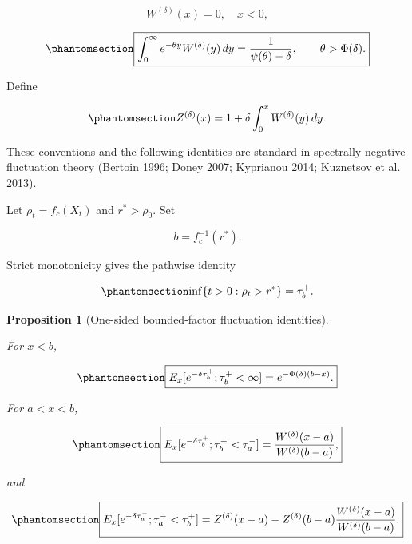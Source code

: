 \documentclass[
  english,
  11pt,
  letterpaper,
  DIV=11,
  numbers=noendperiod]{scrartcl}
\theoremstyle{plain}
\theoremstyle{plain}
\theoremstyle{plain}
\theoremstyle{plain}
\newtheorem{proposition}{Proposition}[section]
\theoremstyle{remark}
\begin{document}
\[
W^{(\delta)}(x)=0,\quad x<0,
\]

\begin{equation}\protect\phantomsection\label{eq-scale-normalization}{
\boxed{
\int_0^\infty e^{-\theta y}W^{(\delta)}(y)\,dy
=\frac1{\psi(\theta)-\delta},
\qquad
\theta>\Phi(\delta).
}
}\end{equation}

Define

\begin{equation}\protect\phantomsection\label{eq-Z-scale}{
Z^{(\delta)}(x)
=1+\delta\int_0^xW^{(\delta)}(y)\,dy.
}\end{equation}

These conventions and the following identities are standard in
spectrally negative fluctuation theory (Bertoin 1996; Doney 2007;
Kyprianou 2014; Kuznetsov et al. 2013).

Let \(\rho_t=f_c(X_t)\) and \(r^*>\rho_0\). Set

\[
b=f_c^{-1}(r^*).
\]

Strict monotonicity gives the pathwise identity

\begin{equation}\protect\phantomsection\label{eq-monotone-barrier-transfer}{
\inf\{t>0:\rho_t>r^*\}
=\tau_b^+.
}\end{equation}

\begin{proposition}[One-sided bounded-factor fluctuation
identities]\protect\hypertarget{prp-levy-barriers}{}\label{prp-levy-barriers}

For \(x<b\),

\begin{equation}\protect\phantomsection\label{eq-upper-passage-transform}{
\boxed{
E_x[e^{-\delta\tau_b^+};\tau_b^+<\infty]
=e^{-\Phi(\delta)(b-x)}.
}
}\end{equation}

For \(a<x<b\),

\begin{equation}\protect\phantomsection\label{eq-two-sided-upper}{
\boxed{
E_x[e^{-\delta\tau_b^+};\tau_b^+<\tau_a^-]
=\frac{W^{(\delta)}(x-a)}
{W^{(\delta)}(b-a)},
}
}\end{equation}

and

\begin{equation}\protect\phantomsection\label{eq-two-sided-lower}{
\boxed{
E_x[e^{-\delta\tau_a^-};\tau_a^-<\tau_b^+]
=Z^{(\delta)}(x-a)
-Z^{(\delta)}(b-a)
\frac{W^{(\delta)}(x-a)}
{W^{(\delta)}(b-a)}.
}
}\end{equation}

\end{proposition}
\end{document}
